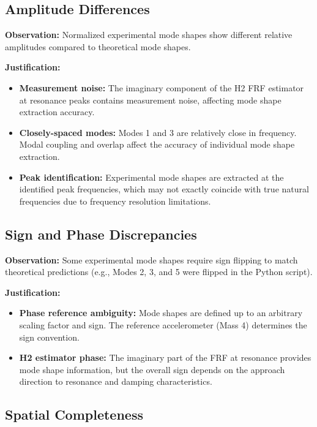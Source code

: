 \documentclass[11pt,a4paper]{article}
\begin{document}
\subsection{Amplitude Differences}

\textbf{Observation:} Normalized experimental mode shapes show different relative amplitudes compared to theoretical mode shapes.

\textbf{Justification:}
\begin{itemize}[leftmargin=*]
    \item \textbf{Measurement noise:} The imaginary component of the H2 FRF estimator at resonance peaks contains measurement noise, affecting mode shape extraction accuracy.

    \item \textbf{Closely-spaced modes:} Modes 1 and 3 are relatively close in frequency. Modal coupling and overlap affect the accuracy of individual mode shape extraction.

    \item \textbf{Peak identification:} Experimental mode shapes are extracted at the identified peak frequencies, which may not exactly coincide with true natural frequencies due to frequency resolution limitations.
\end{itemize}

\subsection{Sign and Phase Discrepancies}

\textbf{Observation:} Some experimental mode shapes require sign flipping to match theoretical predictions (e.g., Modes 2, 3, and 5 were flipped in the Python script).

\textbf{Justification:}
\begin{itemize}[leftmargin=*]
    \item \textbf{Phase reference ambiguity:} Mode shapes are defined up to an arbitrary scaling factor and sign. The reference accelerometer (Mass 4) determines the sign convention.

    \item \textbf{H2 estimator phase:} The imaginary part of the FRF at resonance provides mode shape information, but the overall sign depends on the approach direction to resonance and damping characteristics.
\end{itemize}

\subsection{Spatial Completeness}
\end{document}
